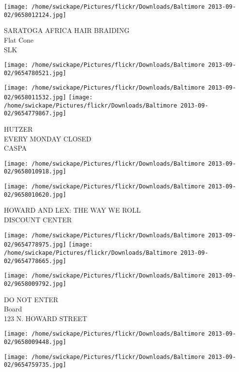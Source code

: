 \documentclass[10pt,letterpaper]{article}
\begin{document}
\vspace{0.25in}
\texttt{[image: /home/swickape/Pictures/flickr/Downloads/Baltimore 2013-09-02/9658012124.jpg]}

SARATOGA AFRICA HAIR BRAIDING\\
Flat Cone\\
SLK\\
\pagebreak

\texttt{[image: /home/swickape/Pictures/flickr/Downloads/Baltimore 2013-09-02/9654780521.jpg]}

\vspace{0.25in}
\texttt{[image: /home/swickape/Pictures/flickr/Downloads/Baltimore 2013-09-02/9658011532.jpg]}
\texttt{[image: /home/swickape/Pictures/flickr/Downloads/Baltimore 2013-09-02/9654779867.jpg]}

HUTZER\\
EVERY MONDAY CLOSED\\
CASPA\\
\pagebreak

\texttt{[image: /home/swickape/Pictures/flickr/Downloads/Baltimore 2013-09-02/9658010918.jpg]}

\vspace{0.25in}
\texttt{[image: /home/swickape/Pictures/flickr/Downloads/Baltimore 2013-09-02/9658010620.jpg]}

HOWARD AND LEX: THE WAY WE ROLL\\
DISCOUNT CENTER\\
\pagebreak

\texttt{[image: /home/swickape/Pictures/flickr/Downloads/Baltimore 2013-09-02/9654778975.jpg]}
\texttt{[image: /home/swickape/Pictures/flickr/Downloads/Baltimore 2013-09-02/9654778665.jpg]}

\vspace{0.25in}
\texttt{[image: /home/swickape/Pictures/flickr/Downloads/Baltimore 2013-09-02/9658009792.jpg]}

DO NOT ENTER\\
Board\\
123 N. HOWARD STREET\\
\pagebreak

\texttt{[image: /home/swickape/Pictures/flickr/Downloads/Baltimore 2013-09-02/9658009448.jpg]}

\vspace{0.25in}
\texttt{[image: /home/swickape/Pictures/flickr/Downloads/Baltimore 2013-09-02/9654759735.jpg]}
\end{document}
